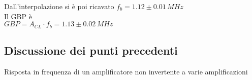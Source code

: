 Dall'interpolazione si è poi ricavato 
$f_b=1.12\pm 0.01 \,MHz $\\
Il GBP è\\
$GBP=A_{CL} \cdot f_b  = 1.13 \pm 0.02 \,MHz$

\subsection{Discussione dei punti precedenti}

\begin{grafico}
 \centering 
  
 \caption{Risposta in frequenza di un amplificatore non invertente a varie amplificazioni} 
 \label{gr:amp_noninv_all.tex} 
\end{grafico}


